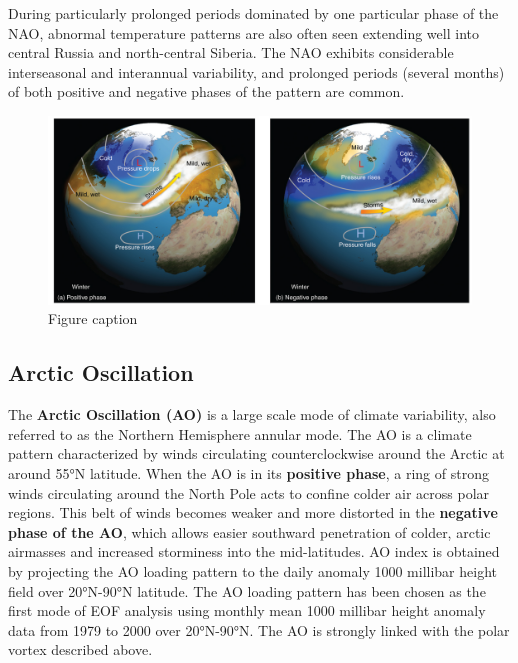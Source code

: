 \documentclass[12pt,oneside]{book}
\begin{document}
During particularly prolonged periods dominated by one particular phase
of the NAO, abnormal temperature patterns are also often seen extending
well into central Russia and north-central Siberia. The NAO exhibits
considerable interseasonal and interannual variability, and prolonged
periods (several months) of both positive and negative phases of the
pattern are common.

\begin{figure}

{\centering \includegraphics[width=0.8\linewidth]{figures/Figure535a} 

}

\caption{Figure caption}\label{fig:Fig535a}
\end{figure}

\subsection{Arctic Oscillation}\label{arctic-oscillation}

The \textbf{Arctic Oscillation (AO)} is a large scale mode of climate
variability, also referred to as the Northern Hemisphere annular mode.
The AO is a climate pattern characterized by winds circulating
counterclockwise around the Arctic at around 55°N latitude. When the AO
is in its \textbf{positive phase}, a ring of strong winds circulating
around the North Pole acts to confine colder air across polar regions.
This belt of winds becomes weaker and more distorted in the
\textbf{negative phase of the AO}, which allows easier southward
penetration of colder, arctic airmasses and increased storminess into
the mid-latitudes. AO index is obtained by projecting the AO loading
pattern to the daily anomaly 1000 millibar height field over 20°N-90°N
latitude. The AO loading pattern has been chosen as the first mode of
EOF analysis using monthly mean 1000 millibar height anomaly data from
1979 to 2000 over 20°N-90°N. The AO is strongly linked with the polar
vortex described above.
\end{document}
